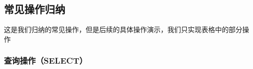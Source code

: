 \documentclass[11pt,a4paper]{article}
\renewcommand{\_}{\origunderscore\allowbreak}
\begin{document}

\subsection{常见操作归纳}

这是我们归纳的常见操作，但是后续的具体操作演示，我们只实现表格中的部分操作

\subsubsection{查询操作（SELECT）}
\end{document}
